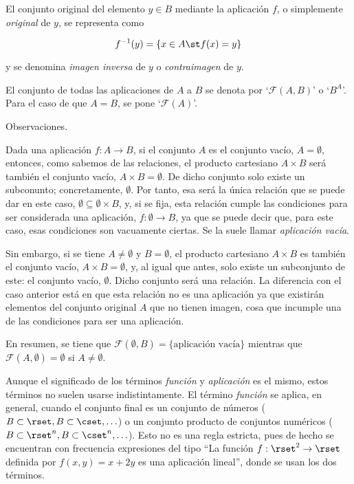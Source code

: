 El conjunto original del elemento $y \in B$ mediante la aplicación $f$, o
simplemente \emph{original} de $y$, se representa como

$$ f^{-1}(y) = \{x \in A \st f(x) = y\} $$

\noindent y se denomina \emph{imagen inversa} de $y$ o \emph{contraimagen}
de $y$.

El conjunto de todas las aplicaciones de $A$ a $B$ se denota por
`$\mathcal{F}(A, B)$' o `$B^{A}$'. Para el caso de que $A = B$, se pone
`$\mathcal{F}(A)$'.

Observaciones.

Dada una aplicación $f: A \longrightarrow B$, si el conjunto $A$ es el
conjunto vacío, $A = \emptyset$, entonces, como sabemos de las relaciones,
el producto cartesiano $A \times B$ será también el conjunto vacío, $A
\times B = \emptyset$. De dicho conjunto solo existe un subconunto;
concretamente, $\emptyset$. Por tanto, esa será la única relación que se
puede dar en este caso, $\emptyset \subseteq \emptyset \times B$, y, si se
fija, esta relación cumple las condiciones para ser considerada una
aplicación, $f: \emptyset \longrightarrow B$, ya que se puede decir que,
para este caso, esas condiciones son vacuamente ciertas. Se la suele llamar
\emph{aplicación vacía}.

Sin embargo, si se tiene $A \neq \emptyset$ y $B = \emptyset$, el producto
cartesiano $A \times B$ es también el conjunto vacío, $A \times B =
\emptyset$, y, al igual que antes, solo existe un subconjunto de este: el
conjunto vacío, $\emptyset$. Dicho conjunto será una relación. La diferencia
con el caso anterior está en que esta relación no es una aplicación ya que
existirán elementos del conjunto original $A$ que no tienen imagen, cosa que
incumple una de las condiciones para ser una aplicación.

En resumen, se tiene que $\mathcal{F}(\emptyset, B) = \{\text{aplicación
vacía}\}$ mientras que $\mathcal{F}(A, \emptyset) = \emptyset$ si $A \neq
\emptyset$.

Aunque el significado de los términos \emph{función} y \emph{aplicación} es
el mismo, estos términos no suelen usarse indistintamente. El término
\emph{función} se aplica, en general, cuando el conjunto final es un
conjunto de números ($B \subset \rset, B \subset \cset, \ldots$) o un
conjunto producto de conjuntos numéricos ($B \subset \rset^n, B \subset
\cset^n, \ldots$). Esto no es una regla estricta, pues de hecho se
encuentran con frecuencia expresiones del tipo ``La función $f : \rset^2 \to
\rset$ definida por $f(x, y) = x + 2y$ es una aplicación lineal'', donde se
usan los dos términos.

